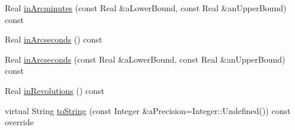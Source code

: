 \begin{DoxyCompactItemize}
\item 
Real \hyperlink{classlibrary_1_1physics_1_1units_1_1_angle_a2d16e08281a9745f0da118b56999f313}{in\+Arcminutes} (const Real \&a\+Lower\+Bound, const Real \&an\+Upper\+Bound) const
\item 
Real \hyperlink{classlibrary_1_1physics_1_1units_1_1_angle_af4f0f122d7136c92505a9ec65835815b}{in\+Arcseconds} () const
\item 
Real \hyperlink{classlibrary_1_1physics_1_1units_1_1_angle_acc904a64f693fa07bac55f28c39ba8b4}{in\+Arcseconds} (const Real \&a\+Lower\+Bound, const Real \&an\+Upper\+Bound) const
\item 
Real \hyperlink{classlibrary_1_1physics_1_1units_1_1_angle_a19611fa8ef42050c6ff9724034544d4f}{in\+Revolutions} () const
\item 
virtual String \hyperlink{classlibrary_1_1physics_1_1units_1_1_angle_aae6b7bd4e028ea7719f5a712ca19a86c}{to\+String} (const Integer \&a\+Precision=Integer\+::\+Undefined()) const override
\end{DoxyCompactItemize}
